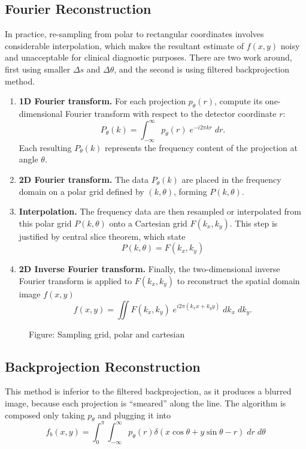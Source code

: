 \documentclass[../../../main.tex]{subfiles}
\begin{document}
\subsection{Fourier Reconstruction}
In practice, re-sampling from polar to rectangular coordinates involves considerable interpolation, which makes the resultant estimate of $f(x,y)$ noisy and unacceptable for clinical diagnostic purposes.
There are two work around, first using smaller $\Delta s$ and $\Delta \theta$, and the second is using filtered backprojection method.

\begin{enumerate}
    \item \textbf{1D Fourier transform.} For each projection \( p_\theta(r) \), compute its one-dimensional Fourier transform with respect to the detector coordinate \( r \):
          \[
              P_\theta(k) = \int_{-\infty}^{\infty} p_\theta(r)\; e^{-i 2 \pi k r}\; dr.
          \]
          Each resulting \( P_\theta(k) \) represents the frequency content of the projection at angle \( \theta \).

    \item \textbf{2D Fourier transform.} The data \( P_\theta(k) \) are placed in the frequency domain on a polar grid defined by \( (k, \theta) \), forming \( P(k,\theta) \).

    \item \textbf{Interpolation.} The frequency data are then resampled or interpolated from this polar grid \( P(k,\theta) \) onto a Cartesian grid \( F(k_x, k_y) \). This step is justified by central slice theorem, which state
          \begin{equation*}
              P(k,\theta)=F(k_x,k_y)
          \end{equation*}

    \item \textbf{2D Inverse Fourier transform.} Finally, the two-dimensional inverse Fourier transform is applied to \( F(k_x, k_y) \) to reconstruct the spatial domain image \( f(x,y) \)
          \[
              f(x,y) = \iint F(k_x, k_y)\; e^{i 2 \pi (k_x x + k_y y)}\; dk_x\; dk_y.
          \]
\end{enumerate}
\begin{figure*}
    \centering
    \caption*{Figure: Sampling grid, polar and cartesian}
\end{figure*}

\subsection{Backprojection Reconstruction}
This method is inferior to the filtered backprojection, as it produces a blurred image, because each projection is “smeared” along the line.
The algorithm is composed only taking $p_\theta$ and plugging it into
\begin{equation*}
    f_b(x,y)=\int_{0 }^{\pi}\int_{-\infty}^{\infty} p_\theta(r)\delta(x\cos\theta+y\sin\theta -r)\;dr\;d\theta
\end{equation*}
\end{document}
